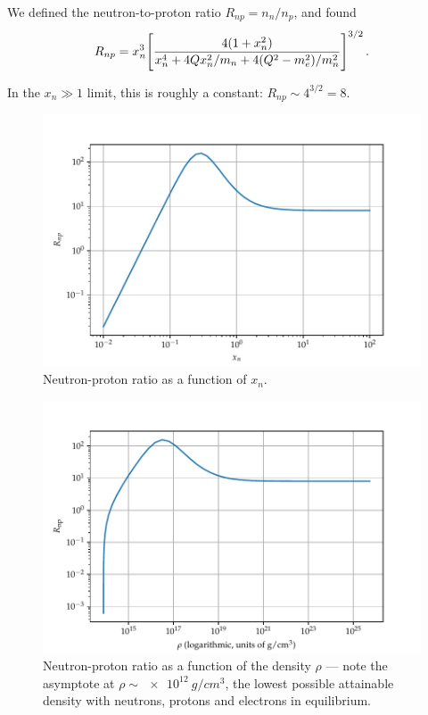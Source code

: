 \documentclass[main.tex]{subfiles}
\begin{document}

We defined the neutron-to-proton ratio \(R_{np} = n_n / n_p\), and found 
%
\begin{align}
R_{np} = x_n^3 \qty[\frac{4 (1 + x_n^2)}{x_n^4 + 4 Q x_n^2 / m_n + 4 (Q^2- m_e^2) / m_n^2}]^{3/2}
\,.
\end{align}

In the \(x_n \gg 1\) limit, this is roughly a constant: \(R_{np} \sim 4^{3/2} = 8\).

\begin{figure}[ht]
\centering
\includegraphics[width=\textwidth]{figures/neutron-proton-ratio}
\caption{Neutron-proton ratio as a function of \(x_n\).}
\label{fig:neutron-proton-ratio}
\end{figure}

\begin{figure}[ht]
\centering
\includegraphics[width=\textwidth]{figures/neutron-proton-ratio-density}
\caption{Neutron-proton ratio as a function of the density \(\rho \) --- note the asymptote at \(\rho \sim \SI{e12}{g/cm^3}\), the lowest possible attainable density with neutrons, protons and electrons in equilibrium.}
\label{fig:neutron-proton-ratio-density}
\end{figure}
\end{document}
